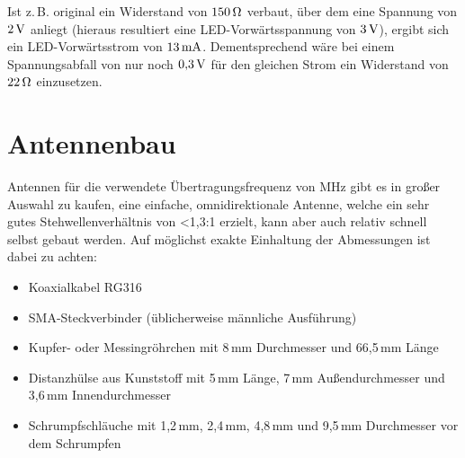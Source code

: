 \documentclass[pdftex, parskip, numbers=noenddot, toc=listof]{scrbook}
\begin{document}
			Ist z.\,B. original ein Widerstand von $\unit[150]{\Omega}$ verbaut, über dem eine Spannung von $\unit[2]{V}$ anliegt (hieraus resultiert eine LED-Vorwärtsspannung von $\unit[3]{V}$), ergibt sich ein LED-Vorwärtsstrom von $\unit[13]{mA}$. Dementsprechend wäre bei einem Spannungsabfall von nur noch $\unit[0{,}3]{V}$ für den gleichen Strom ein Widerstand von $\unit[22]{\Omega}$ einzusetzen.


		\section{Antennenbau}

			Antennen für die verwendete Übertragungsfrequenz von \unit[868]{MHz} gibt es in großer Auswahl zu kaufen, eine einfache, omnidirektionale Antenne, welche ein sehr gutes Stehwellenverhältnis von <1{,}3:1 erzielt, kann aber auch relativ schnell selbst gebaut werden. Auf möglichst exakte Einhaltung der Abmessungen ist dabei zu achten:
			\begin{itemize}
				\item Koaxialkabel RG316
				\item SMA-Steckverbinder (üblicherweise männliche Ausführung)
				\item Kupfer- oder Messingröhrchen mit 8\,mm Durchmesser und 66{,}5\,mm Länge
				\item Distanzhülse aus Kunststoff mit 5\,mm Länge, 7\,mm Außendurchmesser und 3{,}6\,mm Innendurchmesser
				\item Schrumpfschläuche mit 1{,}2\,mm, 2{,}4\,mm, 4{,}8\,mm und 9{,}5\,mm Durchmesser vor dem Schrumpfen
			\end{itemize}
\end{document}
